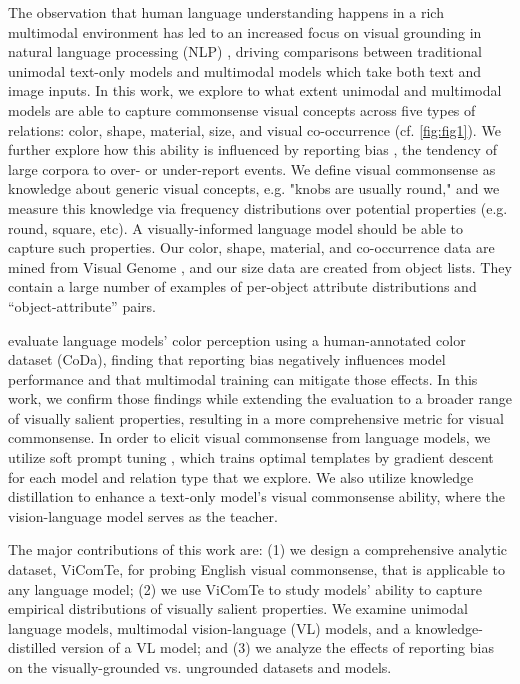 \documentclass[11pt]{article}
\newcommand{\dataset}{ViComTe}
\begin{document}
The observation that human language understanding happens in a rich multimodal environment has led to an increased focus on visual grounding in natural language processing (NLP)  \citep{multimodal-ml,bisk-etal-2020-experience}, driving comparisons between traditional unimodal text-only models and multimodal models which take both text and image inputs. 
In this work, we explore to what extent unimodal and multimodal models are able to capture commonsense visual concepts across five types of relations: color, shape, material, size, and visual co-occurrence (cf. \cref{fig:fig1}).
We further explore how this ability is influenced by reporting bias \citep{Gordon2013ReportingBA}, the tendency of large corpora to over- or under-report events.
We define visual commonsense as knowledge about generic visual concepts, e.g. "knobs are usually round," and we measure this knowledge via frequency distributions over potential properties (e.g. round, square, etc).
A visually-informed language model should be able to capture such properties. Our color, shape, material, and co-occurrence data are mined from Visual Genome \citep{VG}, and our size data are created from object lists. 
They contain a large number of examples of per-object attribute distributions and ``object-attribute'' pairs.

\citet{paik-etal-2021-world} evaluate language models' color perception using a human-annotated color dataset (CoDa), finding that reporting bias negatively influences model performance and that multimodal training can mitigate those effects. 
In this work, we confirm those findings while extending the evaluation to a broader range of visually salient properties, resulting in a more comprehensive metric for visual commonsense. 
In order to elicit visual commonsense from language models, we utilize soft prompt tuning \citep{soft-prompt}, which trains optimal templates by gradient descent for each model and relation type that we explore. 
We also utilize knowledge distillation to enhance a text-only model's visual commonsense ability, where the vision-language model serves as the teacher.

The major contributions of this work are: (1) we design a comprehensive analytic dataset, \dataset, for probing English visual commonsense, that is applicable to any language model; (2) we use {\dataset} to study models' ability to capture empirical distributions of visually salient properties. We examine unimodal language models, multimodal vision-language (VL) models, and a knowledge-distilled version of a VL model; and (3) we analyze the effects of reporting bias on the visually-grounded vs. ungrounded datasets and models.
\end{document}
